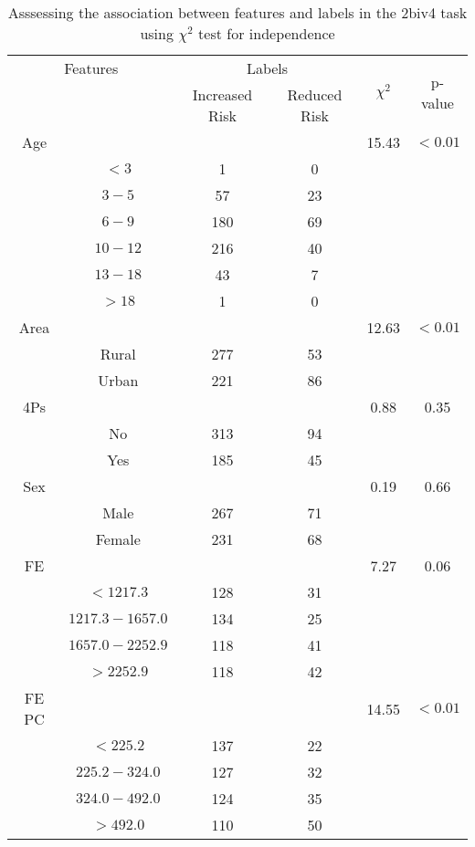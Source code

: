\begin{table}[!htb]
\centering
\caption{Asssessing the association between features and labels in the 2biv4 task using $\chi^2$ test for independence}
\label{tab:chitest_2biv4}
\begin{tabular}{c c | c c| c | c}
\hline
\multicolumn{2}{c|}{Features}& \multicolumn{2}{c|}{Labels}& \multirow{2}{*}{$\chi^2$} & \multirow{2}{*}{p-value}\\ 
& & Increased Risk & Reduced Risk & & \\ 
\hline
Age &  &  & & 15.43 & $< 0.01$ \\ 
& $< 3$ & 1 & 0& & \\ 
& $3-5$ & 57 & 23& & \\ 
& $6-9$ & 180 & 69& & \\ 
& $10-12$ & 216 & 40& & \\ 
& $13-18$ & 43 & 7& & \\ 
& $> 18$ & 1 & 0& & \\ 
\hline 
Area &  &  & & 12.63 & $< 0.01$ \\ 
& Rural & 277 & 53& & \\ 
& Urban & 221 & 86& & \\ 
\hline 
4Ps &  &  & & 0.88 & 0.35 \\ 
& No & 313 & 94& & \\ 
& Yes & 185 & 45& & \\ 
\hline 
Sex &  &  & & 0.19 & 0.66 \\ 
& Male & 267 & 71& & \\ 
& Female & 231 & 68& & \\ 
\hline 
FE &  &  & & 7.27 & 0.06 \\ 
& $< 1217.3$ & 128 & 31& & \\ 
& $1217.3-1657.0$ & 134 & 25& & \\ 
& $1657.0-2252.9$ & 118 & 41& & \\ 
& $> 2252.9$ & 118 & 42& & \\ 
\hline 
FE PC &  &  & & 14.55 & $< 0.01$ \\ 
& $< 225.2$ & 137 & 22& & \\ 
& $225.2-324.0$ & 127 & 32& & \\ 
& $324.0-492.0$ & 124 & 35& & \\ 
& $> 492.0$ & 110 & 50& & \\ 
\hline 
\end{tabular}
\end{table}
